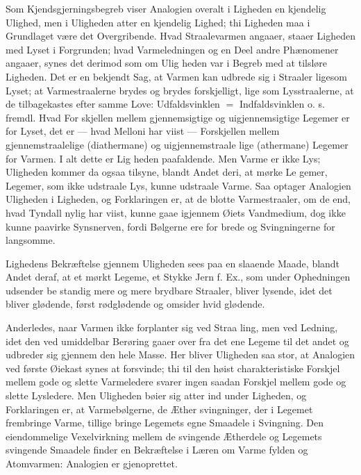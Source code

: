 \documentclass[12pt,a4paper]{book}
\begin{document}
Som Kjendsgjerningsbegreb viser Analogien overalt i Ligheden en
kjendelig Ulighed, men i Uligheden atter en kjendelig Lighed; thi
Ligheden maa i Grundlaget være det Overgribende. Hvad Straalevarmen
angaaer, staaer Ligheden med Lyset i Forgrunden; hvad Varmeledningen og
en Deel andre Phænomener angaaer, synes det derimod som om Ulig\-%
heden var i Begreb med at tilsløre Ligheden. Det er en bekjendt Sag, at
Varmen kan udbrede sig i Straaler ligesom Lyset; at Varmestraalerne
brydes og brydes forskjelligt, lige\-%
som Lysstraalerne, at de tilbagekastes efter samme Love: Udfaldsvinklen
$=$ Indfaldsvinklen o. s. fremdl. Hvad For\-%
skjellen mellem gjennemsigtige og uigjennemsigtige Legemer er for
Lyset, det er --- hvad Melloni har viist --- Forskjellen mellem
gjennemstraalelige (diathermane) og uigjennemstraale\-%
lige (athermane) Legemer for Varmen. I alt dette er Lig\-%
heden paafaldende. Men Varme er ikke Lys; Uligheden kommer da ogsaa
tilsyne, blandt Andet deri, at mørke Le\-%
gemer, Legemer, som ikke udstraale Lys, kunne udstraale Varme. Saa
optager Analogien Uligheden i Ligheden, og Forklaringen er, at de
blotte Varmestraaler, om de end, hvad Tyndall nylig har viist, kunne
gaae igjennem Øiets Vandmedium, dog ikke kunne paavirke Synsnerven,
fordi Bølgerne ere for brede og Svingningerne for langsomme.

Lighedens Bekræftelse gjennem Uligheden sees paa en slaaende Maade,
blandt Andet deraf, at et mørkt Legeme, et Stykke Jern f. Ex., som
under Ophedningen udsender be\-%
standig mere og mere brydbare Straaler, bliver lysende, idet
det bliver glødende, først rødglødende og omsider hvid\-%
glødende.

Anderledes, naar Varmen ikke forplanter sig ved Straa\-%
ling, men ved Ledning, idet den ved umiddelbar Berøring gaaer over fra
det ene Legeme til det andet og udbreder sig gjennem den hele Masse.
Her bliver Uligheden saa stor, at Analogien ved første Øiekast synes at
forsvinde; thi til den høist charakteristiske Forskjel mellem gode og
slette Varmeledere svarer ingen saadan Forskjel mellem gode og slette
Lysledere. Men Uligheden bøier sig atter ind under Ligheden, og
Forklaringen er, at Varmebølgerne, de Æther\-%
svingninger, der i Legemet frembringe Varme, tillige bringe Legemets
egne Smaadele i Svingning. Den eiendommelige Vexelvirkning mellem de
svingende Ætherdele og Legemets svingende Smaadele finder en
Bekræftelse i Læren om Varme\-%
fylden og Atomvarmen: Analogien er gjenoprettet.
\end{document}
